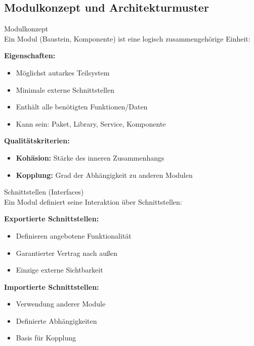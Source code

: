 \subsection{Modulkonzept und Architekturmuster}

\begin{concept}{Modulkonzept}\\
Ein Modul (Baustein, Komponente) ist eine logisch zusammengehörige Einheit:

\textbf{Eigenschaften:}
\begin{itemize}
    \item Möglichst autarkes Teilsystem
    \item Minimale externe Schnittstellen
    \item Enthält alle benötigten Funktionen/Daten
    \item Kann sein: Paket, Library, Service, Komponente
\end{itemize}

\textbf{Qualitätskriterien:}
\begin{itemize}
    \item \textbf{Kohäsion:} Stärke des inneren Zusammenhangs
    \item \textbf{Kopplung:} Grad der Abhängigkeit zu anderen Modulen
\end{itemize}
\end{concept}

\begin{definition}{Schnittstellen (Interfaces)}\\
Ein Modul definiert seine Interaktion über Schnittstellen:

\textbf{Exportierte Schnittstellen:}
\begin{itemize}
    \item Definieren angebotene Funktionalität
    \item Garantierter Vertrag nach außen
    \item Einzige externe Sichtbarkeit
\end{itemize}

\textbf{Importierte Schnittstellen:}
\begin{itemize}
    \item Verwendung anderer Module
    \item Definierte Abhängigkeiten
    \item Basis für Kopplung
\end{itemize}
\end{definition}

